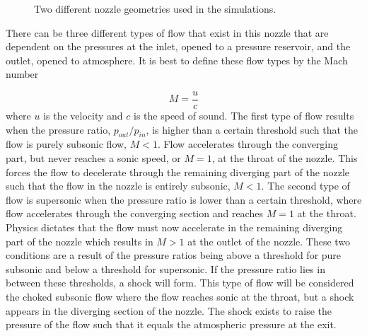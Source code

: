 \documentclass{article}%
\numberwithin{equation}{section}
\begin{document}
\pagebreak
\begin{figure}[h!]
\centering
{}
\vfill
{}
\caption{Two different nozzle geometries used in the simulations. \label{nozzgeo}}
\end{figure}

There can be three different types of flow that exist in this nozzle that are dependent on the pressures at the inlet, opened to a pressure reservoir, and the outlet, opened to atmosphere. It is best to define these flow types by the Mach number

\begin{equation}
M = \frac{u}{c}
\end{equation} 
where $ u $ is the velocity and $ c  $ is the speed of sound. The first type of flow results when the pressure ratio, $p_{out} / p_{in}$, is higher than a certain threshold such that the flow is purely subsonic flow, $M < 1$. Flow accelerates through the converging part, but never reaches a sonic speed, or $M = 1$, at the throat of the nozzle. This forces the flow to decelerate through the remaining diverging part of the nozzle such that the flow in the nozzle is entirely subsonic, $M < 1$. The second type of flow is supersonic when the pressure ratio is lower than a certain threshold, where flow accelerates through the converging section and reaches $M = 1$ at the throat. Physics dictates that the flow must now accelerate in the remaining diverging part of the nozzle which results in $M > 1$ at the outlet of the nozzle. These two conditions are a result of the pressure ratios being above a threshold for pure subsonic and below a threshold for supersonic. If the pressure ratio lies in between these thresholds, a shock will form. This type of flow will be considered the choked subsonic flow where the flow reaches sonic at the throat, but a shock appears in the diverging section of the nozzle. The shock exists to raise the pressure of the flow such that it equals the atmospheric pressure at the exit.
\end{document}
